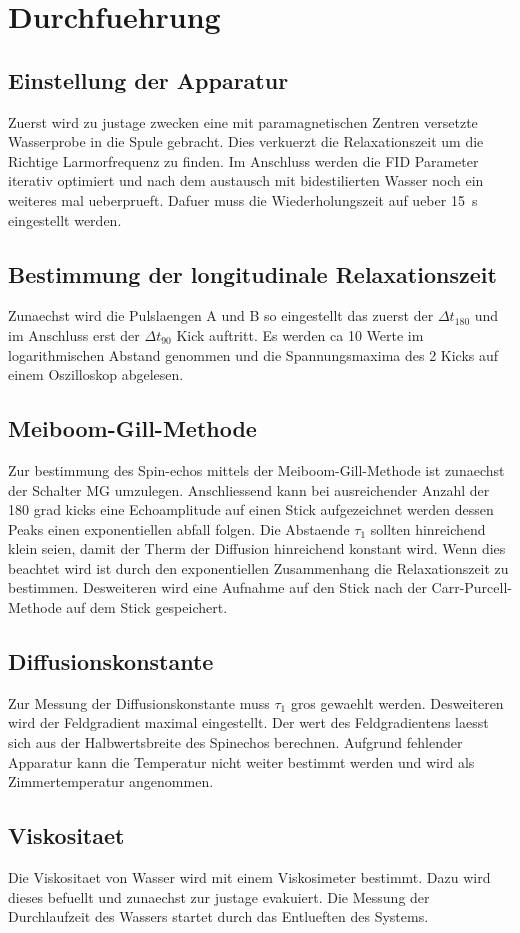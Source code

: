 \section{Durchfuehrung}%
\label{sec:durchfuehrung}

\subsection{Einstellung der Apparatur}%
\label{sub:einstellung_der_apparatur}

Zuerst wird zu justage zwecken eine mit paramagnetischen Zentren versetzte
Wasserprobe in die Spule gebracht.
Dies verkuerzt die Relaxationszeit um die Richtige Larmorfrequenz zu finden. 
Im Anschluss werden die FID Parameter iterativ optimiert und nach dem austausch
mit bidestilierten Wasser noch ein weiteres mal ueberprueft. 
Dafuer muss die Wiederholungszeit auf ueber \SI{15}{\second} eingestellt werden.

\subsection{Bestimmung der longitudinale Relaxationszeit}%
\label{sub:bestimmung_der_longitudinale_relaxationszeit}
Zunaechst wird die Pulslaengen A und B so eingestellt das zuerst der 
$\Delta t_{180}$ und im Anschluss erst der $\Delta t_{90}$ Kick auftritt. 
Es werden ca 10 Werte im logarithmischen Abstand genommen und die
Spannungsmaxima des 2 Kicks auf einem Oszilloskop abgelesen.

\subsection{Meiboom-Gill-Methode}%
\label{sub:meiboom_gill_methode}
Zur bestimmung des Spin-echos mittels der Meiboom-Gill-Methode ist zunaechst der
Schalter MG umzulegen. Anschliessend kann bei ausreichender Anzahl der 180 grad
kicks eine Echoamplitude auf einen Stick aufgezeichnet werden dessen Peaks einen
exponentiellen abfall folgen. 
Die Abstaende $\tau_1$ sollten hinreichend klein seien, damit der Therm der
Diffusion hinreichend konstant wird.
Wenn dies beachtet wird ist durch den exponentiellen Zusammenhang die
Relaxationszeit zu bestimmen. 
Desweiteren wird eine Aufnahme auf den Stick nach der Carr-Purcell-Methode auf
dem Stick gespeichert.

\subsection{Diffusionskonstante}%
\label{sub:diffusionskonstante}
Zur Messung der Diffusionskonstante muss $\tau_1$ gros gewaehlt werden. 
Desweiteren wird der Feldgradient maximal eingestellt.
Der wert des Feldgradientens laesst sich aus der Halbwertsbreite des Spinechos
berechnen.
Aufgrund fehlender Apparatur kann die Temperatur nicht weiter bestimmt werden
und wird als Zimmertemperatur angenommen. 

\subsection{Viskositaet}
Die Viskositaet von Wasser wird mit einem Viskosimeter bestimmt. Dazu wird
dieses befuellt und zunaechst zur justage evakuiert.
Die Messung der Durchlaufzeit des Wassers startet durch das Entlueften des
Systems. 
